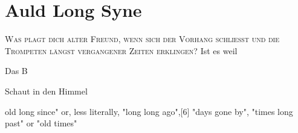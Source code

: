 
\chapter{Auld Long Syne}
\lettrine{W}{as plagt dich alter Freund, wenn sich der Vorhang schließt und die Trompeten längst vergangener Zeiten erklingen?} Ist es weil 

Das B


Schaut in den Himmel 


old long since" or, less literally, "long long ago",[6] "days gone by", "times long past" or "old times"